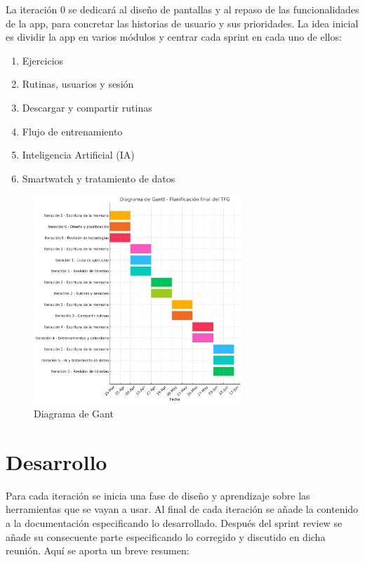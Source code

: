 La iteración 0 se dedicará al diseño de pantallas y al repaso de las funcionalidades de la app, para concretar las historias de usuario y sus prioridades. La idea inicial es dividir la app en varios módulos y centrar cada sprint en cada uno de ellos:

\begin{enumerate}
  \item Ejercicios
  \item Rutinas, usuarios y sesión
  \item Descargar y compartir rutinas
  \item Flujo de entrenamiento
  \item Inteligencia Artificial (IA)
  \item Smartwatch y tratamiento de datos
\end{enumerate}

\begin{figure}[H]
   \centering
    \includegraphics[width=0.7\textwidth]{tablas/gant.png}
    \caption{Diagrama de Gant}
    \label{fig:Gant}
\end{figure}

\section{Desarrollo}

Para cada iteración se inicia una fase de diseño y aprendizaje sobre las herramientas que se vayan a usar. Al final de cada iteración se añade la contenido a la documentación especificando lo desarrollado. Después del sprint review se añade su consecuente parte especificando lo corregido y discutido en dicha reunión. Aquí se aporta un breve resumen:

